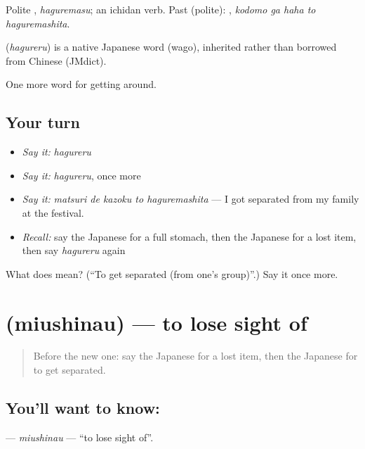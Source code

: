 Polite \textbf{}, \emph{haguremasu}; an ichidan verb. Past (polite): \textbf{  }, \emph{kodomo ga haha to haguremashita}.

\begin{cousinweb}
\textbf{} (\emph{hagureru}) is a native Japanese word (wago), inherited rather than borrowed from Chinese (JMdict).
\end{cousinweb}

\begin{grammarlens}[title={What you've built}]
One more word for getting around.
\end{grammarlens}

\subsection*{Your turn}
\begin{itemize}
\raggedright
  \item \emph{Say it:} \emph{hagureru}
  \item \emph{Say it:} \emph{hagureru}, once more
  \item \emph{Say it:} \emph{matsuri de kazoku to haguremashita} — I got separated from my family at the festival.
  \item \emph{Recall:} say the Japanese for a full stomach, then the Japanese for a lost item, then say \emph{hagureru} again
\end{itemize}

\begin{tcolorbox}[breakable,colback=teal!4,colframe=teal!35!black,title={Before you move on}]
What does  mean? (\textquotedblleft{}To get separated (from one's group)\textquotedblright{}.) Say it once more.
\end{tcolorbox}
\section[\texorpdfstring{\ja{みうしなう} (miushinau)}{みうしなう (miushinau)}]{ (miushinau) — to lose sight of}

\label{lesson:JA-C424-miushinau}



\begin{quote}
Before the new one: say the Japanese for a lost item, then the Japanese for to get separated.
\end{quote}

\subsection*{You'll want to know: }
\textbf{} — \emph{miushinau} — \textquotedblleft{}to lose sight of\textquotedblright{}.

